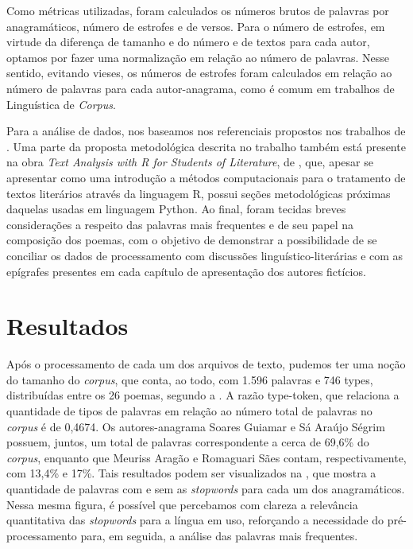 \documentclass[portuguese]{textolivre}
\begin{document}
Como métricas utilizadas, foram calculados os números brutos de palavras por anagramáticos, número de estrofes e de versos. Para o número de estrofes, em virtude da diferença de tamanho e do número e de textos para cada autor, optamos por fazer uma normalização em relação ao número de palavras. Nesse sentido, evitando vieses, os números de estrofes foram calculados em relação ao número de palavras para cada autor-anagrama, como é comum em trabalhos de Linguística de \textit{Corpus}.

Para a análise de dados, nos baseamos nos referenciais propostos nos trabalhos de \textcite{rossi_as_2007,finatto_processamento_2015,berber_sardinha_linguistica_2000,vital_uma_2021}. Uma parte da proposta metodológica descrita no trabalho também está presente na obra \textit{Text Analysis with R for Students of Literature}, de \textcite{jockers_text_2014}, que, apesar se apresentar como uma introdução a métodos computacionais para o tratamento de textos literários através da linguagem R, possui seções metodológicas próximas daquelas usadas em linguagem Python. Ao final, foram tecidas breves considerações a respeito das palavras mais frequentes e de seu papel na composição dos poemas, com o objetivo de demonstrar a possibilidade de se conciliar os dados de processamento com discussões linguístico-literárias e com as epígrafes presentes em cada capítulo de apresentação dos autores fictícios.


\section{Resultados}\label{sec-conduta}
Após o processamento de cada um dos arquivos de texto, pudemos ter uma noção do tamanho do \textit{corpus}, que conta, ao todo, com 1.596 palavras e 746 types, distribuídas entre os 26 poemas, segundo a . A razão type-token, que relaciona a quantidade de tipos de palavras em relação ao número total de palavras no \textit{corpus} é de 0,4674. Os autores-anagrama Soares Guiamar e Sá Araújo Ségrim possuem, juntos, um total de palavras correspondente a cerca de 69,6\% do \textit{corpus}, enquanto que Meuriss Aragão e Romaguari Sães contam, respectivamente, com 13,4\% e 17\%. Tais resultados podem ser visualizados na , que mostra a quantidade de palavras com e sem as \textit{stopwords} para cada um dos anagramáticos. Nessa mesma figura, é possível que percebamos com clareza a relevância quantitativa das \textit{stopwords} para a língua em uso, reforçando a necessidade do pré-processamento para, em seguida, a análise das palavras mais frequentes. 
\end{document}

